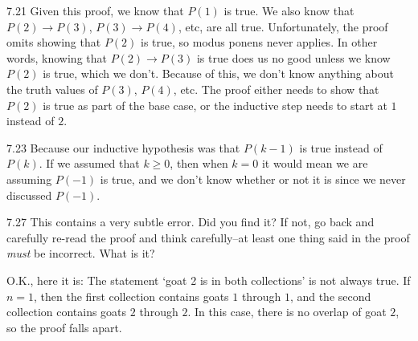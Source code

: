 \begin{Answer}{7.21}
Given this proof, we know that $P(1)$ is true.
We also know that
$P(2)\rightarrow P(3)$, $P(3)\rightarrow P(4)$, etc,
are all true.
Unfortunately, the proof omits showing that $P(2)$ is true,
so modus ponens never applies.   In other words, knowing that
$P(2)\rightarrow P(3)$ is true does us no good unless we know
$P(2)$ is true, which we don't.  Because of this, we don't
know anything about the truth values of $P(3)$, $P(4)$, etc.
The proof either needs to show that $P(2)$ is true as part of
the base case, or the inductive step needs to start at $1$
instead of $2$.
\end{Answer}
\begin{Answer}{7.23}
Because our inductive hypothesis was that $P(k-1)$ is true instead of $P(k)$.
If we assumed that $k\geq 0$, then when $k=0$ it would mean we are assuming $P(-1)$ is true, and
we don't know whether or not it is since we never discussed $P(-1)$.
\end{Answer}
\begin{Answer}{7.27}
This contains a very subtle error.  Did you find it?
If not, go back and carefully re-read the proof and think
carefully--at least one thing said in the proof {\em must}
be incorrect.  What is it?

O.K., here it is:  The statement `goat 2 is in both collections'
is not always true.  If $n=1$, then the first collection
contains goats $1$ through $1$, and the second collection
contains goats $2$ through $2$.  In this case, there is no overlap
of goat $2$, so the proof falls apart.
\end{Answer}

